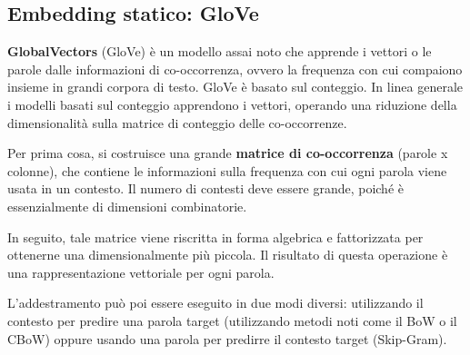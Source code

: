 \subsection{Embedding statico: GloVe}
\textbf{GlobalVectors} (GloVe) è un modello assai noto che apprende i vettori o le parole dalle informazioni di co-occorrenza, ovvero la frequenza con cui compaiono insieme in grandi corpora di testo. GloVe è basato sul conteggio. In linea generale i modelli basati sul conteggio apprendono i vettori, operando una riduzione della dimensionalità sulla matrice di conteggio delle co-occorrenze.

Per prima cosa, si costruisce una grande \textbf{matrice di co-occorrenza} (parole x colonne), che contiene le informazioni sulla frequenza con cui ogni parola viene usata in un contesto. Il numero di contesti deve essere grande, poiché è essenzialmente di dimensioni combinatorie.

In seguito, tale matrice viene riscritta in forma algebrica e fattorizzata per ottenerne una dimensionalmente più piccola. Il risultato di questa operazione è una rappresentazione vettoriale per ogni parola.

L’addestramento può poi essere eseguito in due modi diversi: utilizzando il contesto per predire una parola target (utilizzando metodi noti come il BoW\textsuperscript{\cite{bow_article}} o il CBoW\textsuperscript{\cite{mikolov2013efficient}}) oppure usando una parola per predirre il contesto target (Skip-Gram\textsuperscript{\cite{skipgram}}).
    
